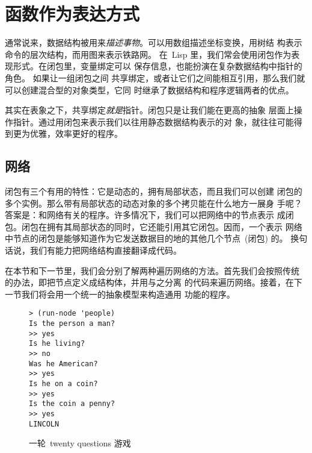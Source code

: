 
\chapter{函数作为表达方式}
\label{chap:functions_as_representation}

通常说来，数据结构被用来\emph{描述事物}。可以用数组描述坐标变换，用树结
构表示命令的层次结构，而用图来表示铁路网。
在~Lisp 里，我们常会使用闭包作为表现形式。在闭包里，变量绑定可以
保存信息，也能扮演在复杂数据结构中指针的角色。
如果让一组闭包之间
共享绑定，或者让它们之间能相互引用，那么我们就可以创建混合型的对象类型，它同
时继承了数据结构和程序逻辑两者的优点。

其实在表象之下，共享绑定\emph{就是}指针。闭包只是让我们能在更高的抽象
层面上操作指针。通过用闭包来表示我们以往用静态数据结构表示的对
象，就往往可能得到更为优雅，效率更好的程序。

\section{网络}
\label{sec:networks}

闭包有三个有用的特性：它是动态的，拥有局部状态，而且我们可以创建
闭包的多个实例。那么带有局部状态的动态对象的多个拷贝能在什么地方一展身
手呢？答案是：和网络有关的程序。许多情况下，我们可以把网络中的节点表示
成闭包。闭包在拥有其局部状态的同时，它还能引用其它闭包。因而，一个表示
网络中节点的闭包是能够知道作为它发送数据目的地的其他几个节点~(闭包) 的。
换句话说，我们有能力把网络结构直接翻译成代码。

在本节和下一节里，我们会分别了解两种遍历网络的方法。首先我们会按照传统
的办法，即把节点定义成结构体，并用与之分离
的代码来遍历网络。接着，在下一节我们将会用一个统一的抽象模型来构造通用
功能的程序。

\begin{figure}
\begin{lstlisting}
> (run-node 'people)
Is the person a man?
>> yes
Is he living?
>> no
Was he American?
>> yes
Is he on a coin?
>> yes
Is the coin a penny?
>> yes
LINCOLN
\end{lstlisting}
\caption{\label{fig:session_of_20_questions}一轮~twenty questions 游戏}
\end{figure}

